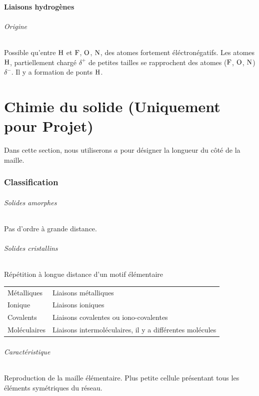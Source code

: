 \documentclass[11pt,a4paper,french]{article}
\begin{document}
\subsection{Liaisons hydrogènes}
\paragraph{Origine}
Possible qu'entre $\ce{H}$ et $\ce{F}$, $\ce{O}$, $\ce{N}$, des atomes fortement éléctronégatifs.
Les atomes $\ce{H}$, partiellement chargé $\delta^+$ de petites tailles se rapprochent des atomes ($\ce{F}$, $\ce{O}$, $\ce{N}$) $\delta^-$.
Il y a formation de ponts $\ce{H}$.

\part{Chimie du solide (Uniquement pour Projet)}
Dans cette section, nous utiliserons $a$ pour désigner la longueur du côté de la maille.

\section{Classification}

\paragraph{Solides amorphes}
Pas d'ordre à grande distance.

\paragraph{Solides cristallins}
Répétition à longue distance d'un motif élémentaire
\begin{center}
	\begin{tabular}{ll}
		Métalliques & Liaisons métalliques\\
		Ionique & Liaisons ioniques\\
		Covalents & Liaisons covalentes ou iono-covalentes\\
		Moléculaires & Liaisons intermoléculaires, il y a différentes molécules
	\end{tabular}
\end{center}

\paragraph{Caractéristique}
Reproduction de la maille élémentaire.
Plus petite cellule présentant tous les éléments symétriques du réseau.
\end{document}
